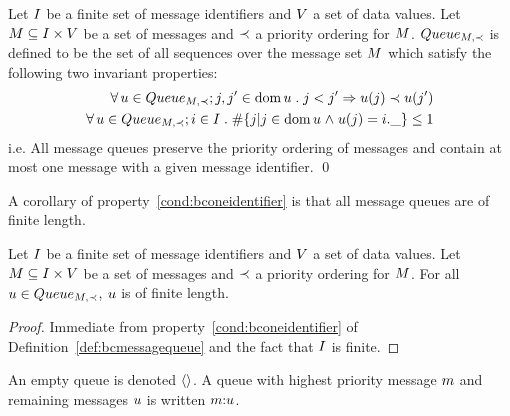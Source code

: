 \begin{definition}\label{def:bcmessagequeue}
Let $I$ be a finite set of message identifiers and $V$ a set of data
values.  Let ${M} \subseteq I \times V$ be a set of messages and
$\prec$ a priority ordering for ${M}$.  ${Queue_{{M},\prec}}$ is defined
to be the set of all sequences over the message set ${M}$ which satisfy
the following two invariant properties:
\begin{eqnarray}
  \forall \mq \in \Queue{\M,\pless}; j,j' \in \dom \mq \such j < j' \implies 
     \mq(j) \pless \mq(j')
  \label{cond:bcpriorityordering} \\
   \forall \mq \in \Queue{\M,\pless}; \ii \in \I \such 
 \# \{\jj | \jj \in \dom \mq \land \mq(\jj) = \ii.\_\} \leq 1
 \label{cond:bconeidentifier}
\end{eqnarray}
i.e. All message queues preserve the priority ordering of messages 
  and contain at most one message with a given message identifier. 
\qed
\end{definition}

A corollary of property~\ref{cond:bconeidentifier} is that all message
queues are of finite length.
\begin{proposition}
Let $I$ be a finite set of message identifiers and $V$ a set of data
values.  Let ${M} \subseteq I \times V$ be a set of messages and
$\prec$ a priority ordering for ${M}$. For all $u \in {Queue_{{M},\prec}}$,
$u$ is of finite length.
\end{proposition}
\begin{proof}
Immediate from property~\ref{cond:bconeidentifier} of
Definition~\ref{def:bcmessagequeue} and the fact that $I$ is finite.
\end{proof}

\begin{notation}
An empty queue is denoted ${\langle\rangle}$. A queue with highest priority
message ${m}$ and remaining messages $u$ is written ${m} {:}
u$.
\end{notation}

